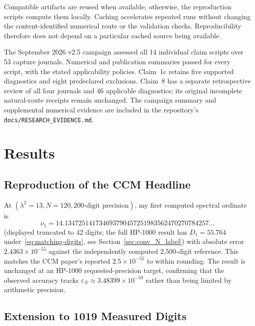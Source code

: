 \documentclass[11pt,a4paper]{article}
\begin{document}
Compatible artifacts are reused when available; otherwise, the
reproduction scripts compute them locally. Caching accelerates repeated
runs without changing the content-identified numerical route or the
validation checks. Reproducibility therefore does not depend on a
particular cached source being available.

The September 2026 v2.5 campaign assessed all 14 individual claim
scripts over 53 capture journals. Numerical and publication summaries
passed for every script, with the stated applicability policies.
Claim~1c retains five supported diagnostics and eight predeclared
exclusions. Claim~8 has a separate retrospective review of all four
journals and 46 applicable diagnostics; its original incomplete
natural-route receipts remain unchanged. The campaign summary
and supplemental numerical evidence are included in the repository's
\texttt{docs/RESEARCH\_EVIDENCE.md}.

\section{Results}

\subsection{Reproduction of the CCM Headline}
\label{sec:headline}

At $(\lambda^2{=}13,N{=}120,200\text{-digit precision})$, my first
computed spectral ordinate is
\[
\nu_1=14.134725141734693790457251983562470270784257\ldots
\]
(displayed truncated to $42$ digits; the full HP-1000 result has
$D_1=55.764$ under~\eqref{eq:matching-digits}, see
Section~\ref{sec:conv_N_label}) with absolute error
$2.4363\times10^{-55}$ against the independently computed 2,500-digit
reference. This matches the CCM paper's reported
$2.5\times10^{-55}$ to within rounding. The result is unchanged at an
HP-1000 requested-precision target, confirming that the observed
accuracy tracks $\varepsilon_N\approx3.48399\times10^{-59}$ rather
than being limited by arithmetic precision.

\subsection{Extension to 1019 Measured Digits}
\end{document}
